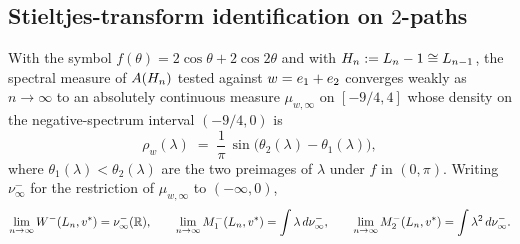 \subsection{Stieltjes-transform identification on $2$-paths}\label{sec:subfamily:2path-stieltjes}

\begin{theorem}\label{thm:2path-stieltjes}
With the symbol $f(\theta) = 2\cos\theta + 2\cos 2\theta$ and with
$H_{n} := L_{n} - 1 \cong L_{n-1}$, the spectral measure of
$A(H_{n})$ tested against $w = e_{1} + e_{2}$ converges
weakly as $n \to \infty$ to an absolutely continuous measure
$\mu_{w, \infty}$ on $[-9/4, 4]$ whose density on the negative-spectrum
interval $(-9/4, 0)$ is
\[
\rho_{w}(\lambda) \;=\; \frac{1}{\pi}\, \sin\bigl(\theta_{2}(\lambda) - \theta_{1}(\lambda)\bigr),
\]
where $\theta_{1}(\lambda) < \theta_{2}(\lambda)$ are the two preimages
of $\lambda$ under $f$ in $(0, \pi)$. Writing $\nu^{-}_{\infty}$ for
the restriction of $\mu_{w, \infty}$ to $(-\infty, 0)$,
\[
\lim_{n \to \infty} W^{-}(L_{n}, v^{*}) = \nu^{-}_{\infty}(\mathbb{R}),
\qquad
\lim_{n \to \infty} M_{1}^{-}(L_{n}, v^{*}) = \int \lambda\, d\nu^{-}_{\infty},
\qquad
\lim_{n \to \infty} M_{2}^{-}(L_{n}, v^{*}) = \int \lambda^{2}\, d\nu^{-}_{\infty}.
\]
\end{theorem}

